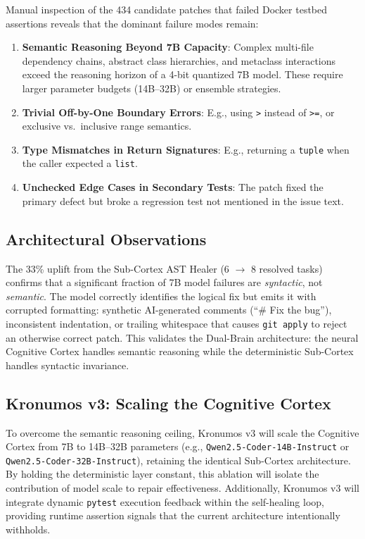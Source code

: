\documentclass[10pt,twocolumn,letterpaper]{article}
\begin{document}
Manual inspection of the 434 candidate patches that failed Docker testbed assertions reveals that the dominant failure modes remain:
\begin{enumerate}
    \item \textbf{Semantic Reasoning Beyond 7B Capacity}: Complex multi-file dependency chains, abstract class hierarchies, and metaclass interactions exceed the reasoning horizon of a 4-bit quantized 7B model. These require larger parameter budgets (14B--32B) or ensemble strategies.
    \item \textbf{Trivial Off-by-One Boundary Errors}: E.g., using \texttt{>} instead of \texttt{>=}, or exclusive vs.\ inclusive range semantics.
    \item \textbf{Type Mismatches in Return Signatures}: E.g., returning a \texttt{tuple} when the caller expected a \texttt{list}.
    \item \textbf{Unchecked Edge Cases in Secondary Tests}: The patch fixed the primary defect but broke a regression test not mentioned in the issue text.
\end{enumerate}

\subsection{Architectural Observations}
The 33\% uplift from the Sub-Cortex AST Healer (6 $\to$ 8 resolved tasks) confirms that a significant fraction of 7B model failures are \textit{syntactic}, not \textit{semantic}. The model correctly identifies the logical fix but emits it with corrupted formatting: synthetic AI-generated comments (``\# Fix the bug''), inconsistent indentation, or trailing whitespace that causes \texttt{git apply} to reject an otherwise correct patch. This validates the Dual-Brain architecture: the neural Cognitive Cortex handles semantic reasoning while the deterministic Sub-Cortex handles syntactic invariance.

\subsection{Kronumos v3: Scaling the Cognitive Cortex}
To overcome the semantic reasoning ceiling, Kronumos v3 will scale the Cognitive Cortex from 7B to 14B--32B parameters (e.g., \texttt{Qwen2.5-Coder-14B-Instruct} or \texttt{Qwen2.5-Coder-32B-Instruct}), retaining the identical Sub-Cortex architecture. By holding the deterministic layer constant, this ablation will isolate the contribution of model scale to repair effectiveness. Additionally, Kronumos v3 will integrate dynamic \texttt{pytest} execution feedback within the self-healing loop, providing runtime assertion signals that the current architecture intentionally withholds.
\end{document}
